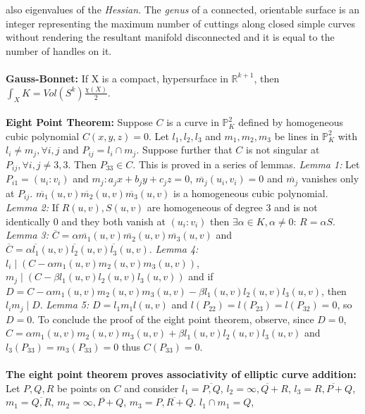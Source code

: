 also eigenvalues of the \emph{Hessian}.
The \emph{genus} of a connected, orientable surface is an 
integer representing the maximum number of cuttings along closed simple curves without 
rendering the resultant manifold disconnected and it is equal to the number 
of handles on it. 
\\
\\
{\bf Gauss-Bonnet:}  If X is a compact, hypersurface in ${\mathbb R}^{k+1}$, then
$\int_X K = Vol( S^k ){\frac {\chi (X)} {2}}$.
\\
\\
{\bf Eight Point Theorem:}
Suppose $C$ is a curve in ${\mathbb P}^2_K$ defined by 
homogeneous cubic polynomial $C(x,y,z)=0$.
Let $l_1, l_2, l_3$ and $m_1, m_2, m_3$ be lines in ${\mathbb P}^2_K$ with 
$l_i \ne m_j, \forall i,j$ and $P_{ij}= l_i \cap m_j$.  Suppose further that $C$ is not
singular at $P_{ij}, \forall i,j \ne 3,3$.  Then $P_{33} \in C$.
This is proved in a series of lemmas. \emph{Lemma 1:} Let $P_{i1}=(u_i : v_i)$ 
and $m_j : a_j x +b_j y +c_j z=0$, 
${\overline {m_j}} (u_i, v_i) = 0$ and
${\overline {m_j}}$ vanishes only at $P_{ij}$.
${\overline {m_1}} (u,v) {\overline {m_2}} (u,v) {\overline {m_3}} (u,v)$
is a homogeneous cubic polynomial.   
\emph{Lemma 2:} If $R(u,v), S(u,v)$ are homogeneous of
degree $3$ and is not identically $0$ and they both vanish at $(u_i:v_i)$ then 
$\exists  \alpha \in K, \alpha \ne 0$: $R = \alpha S$.  
\emph{Lemma 3:}
${\overline C}= \alpha {\overline {m_1}} (u,v) {\overline {m_2}} (u,v) {\overline {m_3}} (u,v)$
and
${\overline C}= \alpha {\overline {l_1}} (u,v) {\overline {l_2}} (u,v) {\overline {l_3}} (u,v)$.
\emph{Lemma 4:}  $l_i \mid (C - \alpha m_1 (u,v) m_2 (u,v) m_3 (u,v))$,
$m_j \mid (C - \beta l_1(u,v) l_2 (u,v) l_3 (u,v))$ and
if $D= C - \alpha m_1 (u,v) m_2 (u,v) m_3 (u,v) - \beta l_1 (u,v) l_2 (u,v) l_3 (u,v)$, then
$l_i m_ j \mid D$.  
\emph{Lemma 5:} $D = l_1 m_1 l(u,v)$ and
$l(P_{22})= l(P_{23})= l(P_{32})=0$, so $D=0$.  To conclude the proof of the
eight point theorem, observe, since $D=0$, 
$C= \alpha m_1 (u,v) m_2 (u,v) m_3 (u,v) + \beta l_1 (u,v) l_2 (u,v) l_3 (u,v)$ and
$l_3 (P_{33})= m_3 (P_{33}) =0$ thus $C (P_{33})=0$.
\\
\\
{\bf The eight point theorem proves associativity of elliptic curve addition:}
Let $P, Q, R$ be points
on $C$ and consider
$l_1= {\overline {P,Q}}$,
$l_2= {\overline {\infty,Q+R}}$,
$l_3= {\overline {R,P+Q}}$,
$m_1= {\overline {Q,R}}$,
$m_2= {\overline {\infty,P+Q}}$,
$m_3= {\overline {P,R+Q}}$.
$l_1 \cap m_1= Q$,
